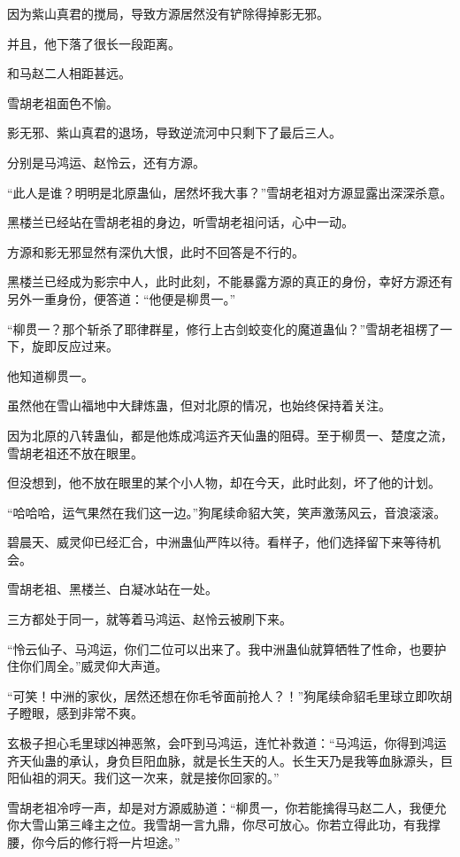 \begin{this_body}
因为紫山真君的搅局，导致方源居然没有铲除得掉影无邪。

并且，他下落了很长一段距离。

和马赵二人相距甚远。

雪胡老祖面色不愉。

影无邪、紫山真君的退场，导致逆流河中只剩下了最后三人。

分别是马鸿运、赵怜云，还有方源。

“此人是谁？明明是北原蛊仙，居然坏我大事？”雪胡老祖对方源显露出深深杀意。

黑楼兰已经站在雪胡老祖的身边，听雪胡老祖问话，心中一动。

方源和影无邪显然有深仇大恨，此时不回答是不行的。

黑楼兰已经成为影宗中人，此时此刻，不能暴露方源的真正的身份，幸好方源还有另外一重身份，便答道：“他便是柳贯一。”

“柳贯一？那个斩杀了耶律群星，修行上古剑蛟变化的魔道蛊仙？”雪胡老祖楞了一下，旋即反应过来。

他知道柳贯一。

虽然他在雪山福地中大肆炼蛊，但对北原的情况，也始终保持着关注。

因为北原的八转蛊仙，都是他炼成鸿运齐天仙蛊的阻碍。至于柳贯一、楚度之流，雪胡老祖还不放在眼里。

但没想到，他不放在眼里的某个小人物，却在今天，此时此刻，坏了他的计划。

“哈哈哈，运气果然在我们这一边。”狗尾续命貂大笑，笑声激荡风云，音浪滚滚。

碧晨天、威灵仰已经汇合，中洲蛊仙严阵以待。看样子，他们选择留下来等待机会。

雪胡老祖、黑楼兰、白凝冰站在一处。

三方都处于同一，就等着马鸿运、赵怜云被刷下来。

“怜云仙子、马鸿运，你们二位可以出来了。我中洲蛊仙就算牺牲了性命，也要护住你们周全。”威灵仰大声道。

“可笑！中洲的家伙，居然还想在你毛爷面前抢人？！”狗尾续命貂毛里球立即吹胡子瞪眼，感到非常不爽。

玄极子担心毛里球凶神恶煞，会吓到马鸿运，连忙补救道：“马鸿运，你得到鸿运齐天仙蛊的承认，身负巨阳血脉，就是长生天的人。长生天乃是我等血脉源头，巨阳仙祖的洞天。我们这一次来，就是接你回家的。”

雪胡老祖冷哼一声，却是对方源威胁道：“柳贯一，你若能擒得马赵二人，我便允你大雪山第三峰主之位。我雪胡一言九鼎，你尽可放心。你若立得此功，有我撑腰，你今后的修行将一片坦途。”


\end{this_body}
